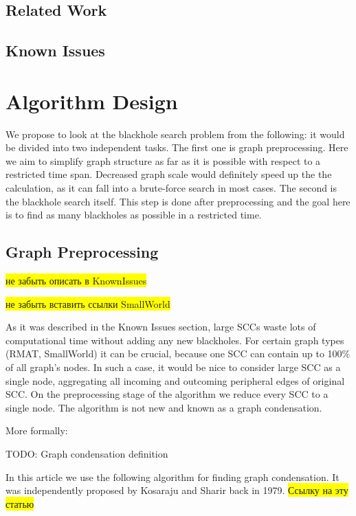 \documentclass{svproc}
\newcommand{\FIXME}[1]{ %
	\colorbox{yellow}{#1}
}
\newcommand{\FIXME}[1]{ %
}
\begin{document}
%
\subsection{Related Work}
\cite{li2010detecting,li2012mining,li2014mining,hong2015detecting}

%
\subsection{Known Issues}
%

%
\section{Algorithm Design}
We propose to look at the blackhole search problem from the following: it would be divided into two independent tasks. 
The first one is graph preprocessing. Here we aim to simplify graph structure as far as it is possible with respect to a restricted time span. 
Decreased graph scale would definitely speed up the the calculation, as it can fall into a brute-force search in most cases.
The second is the blackhole search itself. This step is done after preprocessing and the goal here is to find as many blackholes as possible in a restricted time.
%

%
\subsection{Graph Preprocessing}
\FIXME{не забыть описать в KnownIssues}

\FIXME{не забыть вставить ссылки SmallWorld \cite{watts1999networks}}

As it was described in the Known Issues section, large SCCs waste lots of computational time without adding any new blackholes. 
For certain graph types (RMAT, SmallWorld) it can be crucial, because one SCC can contain up to 100\% of all graph's nodes. 
In such a case, it would be nice to consider large SCC as a single node, aggregating all incoming and outcoming peripheral edges
of original SCC.
On the preprocessing stage of the algorithm we reduce every SCC to a single node. The algorithm is not new and known as a graph condensation.

More formally:

\begin{definition}
TODO: Graph condensation definition
\end{definition}

In this article we use the following algorithm for finding graph condensation.
It was independently proposed by Kosaraju and Sharir back in 1979. \FIXME{Ссылку на эту статью}
\end{document}

